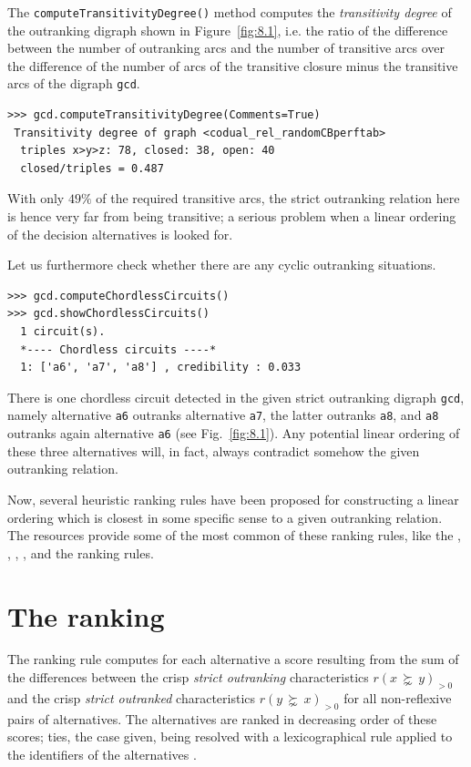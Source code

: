 The \texttt{computeTransitivityDegree()} method computes the \emph{transitivity degree} of the outranking digraph shown in Figure~\vref{fig:8.1}, i.e. the ratio of the difference between the number of outranking arcs and the number of transitive arcs over the difference of the number of arcs of the transitive closure minus the transitive arcs of the digraph \texttt{gcd}.
\begin{lstlisting}
>>> gcd.computeTransitivityDegree(Comments=True)
 Transitivity degree of graph <codual_rel_randomCBperftab>
  triples x>y>z: 78, closed: 38, open: 40
  closed/triples = 0.487
\end{lstlisting}    

With only $49\%$ of the required transitive arcs, the strict outranking relation here is hence very far from being transitive; a serious problem when a linear ordering of the decision alternatives is looked for.

Let us furthermore check whether there are any cyclic outranking situations.
\begin{lstlisting}
>>> gcd.computeChordlessCircuits()
>>> gcd.showChordlessCircuits()
  1 circuit(s).
  *---- Chordless circuits ----*    
  1: ['a6', 'a7', 'a8'] , credibility : 0.033
\end{lstlisting}

There is one chordless circuit detected in the given strict outranking digraph \texttt{gcd}, namely alternative \texttt{a6} outranks alternative \texttt{a7}, the latter outranks \texttt{a8}, and \texttt{a8} outranks again alternative \texttt{a6} (see Fig.~\vref{fig:8.1}). Any potential linear ordering of these three alternatives will, in fact, always contradict somehow the given outranking relation.

Now, several heuristic ranking rules have been proposed for constructing a linear ordering which is closest in some specific sense to a given outranking relation. The \Digraph resources provide some of the most common of these ranking rules, like the \Copeland, \Kemeny, \Slater, \Kohler, and the \RankedPairs ranking rules.

\section{The \Copeland ranking}
\label{sec:8.2}

\begin{definition}\label{def:8.1}

\noindent The \Copeland ranking rule computes for each alternative a score resulting from the sum of the differences between the crisp \emph{strict outranking} characteristics $r(x\, \succnsim \,y)_{>0}$ and the crisp \emph{strict outranked} characteristics $r(y\, \succnsim \, x)_{>0}$  for all non-reflexive pairs of alternatives. The alternatives are ranked in decreasing order of these scores; ties, the case given, being resolved with a lexicographical rule applied to the identifiers of the alternatives \citep{COP-1951}.
\end{definition}

